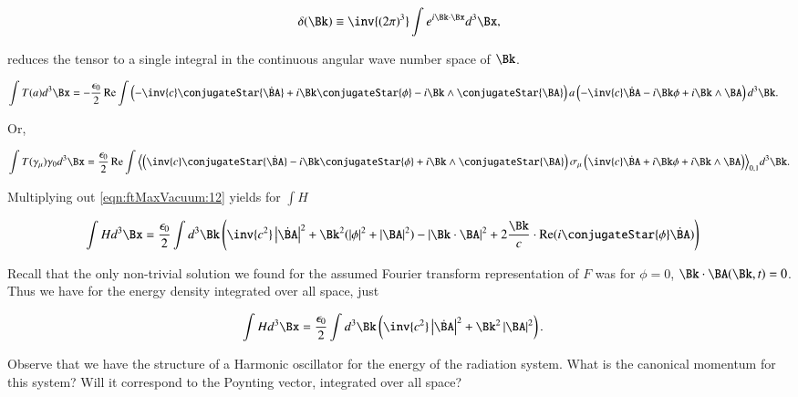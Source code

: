 \begin{align}
\label{eqn:ftMaxVacuum:9}
\delta(\Bk) \equiv \inv{(2 \pi)^3} \int e^{i \Bk \cdot \Bx} d^3 \Bx,
\end{align}

reduces the tensor to a single integral in the continuous angular wave number space of $\Bk$.

\begin{align}
\label{eqn:ftMaxVacuum:10}
\int T(a) d^3 \Bx &= -\frac{\epsilon_0}{2} \Real \int
\left(
- \inv{c} \conjugateStar{\dot{\BA}}
+ i \Bk \conjugateStar{\phi}
- i \Bk \wedge \conjugateStar{\BA}
\right)
a
\left(
- \inv{c} \dot{\BA}
- i \Bk \phi
+ i \Bk \wedge \BA
\right)
d^3 \Bk.
\end{align}

Or,

\begin{align}
\label{eqn:ftMaxVacuum:12}
\int T(\gamma_\mu) \gamma_0 d^3 \Bx =
\frac{\epsilon_0}{2} \Real \int
\gpgrade{
\left(
\inv{c} \conjugateStar{\dot{\BA}}
- i \Bk \conjugateStar{\phi}
+ i \Bk \wedge \conjugateStar{\BA}
\right)
\sigma_\mu
\left(
\inv{c} \dot{\BA}
+ i \Bk \phi
+ i \Bk \wedge \BA
\right)
}{0,1}
d^3 \Bk.
\end{align}


Multiplying out \autoref{eqn:ftMaxVacuum:12} yields for $\int H$

\begin{align}
\label{eqn:ftMaxVacuum:14}
\int H d^3 \Bx &=
\frac{\epsilon_0}{2} \int d^3 \Bk \left(
\inv{c^2} \Abs{\dot{\BA}}^2 + \Bk^2 (\Abs{\phi}^2 + \Abs{\BA}^2 )
- \Abs{\Bk \cdot \BA}^2
+ 2 \frac{\Bk}{c} \cdot \Real( i \conjugateStar{\phi} \dot{\BA} )
\right)
\end{align}

Recall that the only non-trivial solution we found for the assumed Fourier transform representation of $F$ was for $\phi = 0$, $\Bk \cdot \BA(\Bk, t) = 0$.  Thus we have for the energy density integrated over all space, just

\begin{align}
\label{eqn:ftMaxVacuum:14b}
\int H d^3 \Bx &=
\frac{\epsilon_0}{2} \int d^3 \Bk \left(
\inv{c^2} \Abs{\dot{\BA}}^2 + \Bk^2 \Abs{\BA}^2 
\right).
\end{align}

Observe that we have the structure of a Harmonic oscillator for the energy of the radiation system.  What is the canonical momentum for this system?  Will it correspond to the Poynting vector, integrated over all space?

